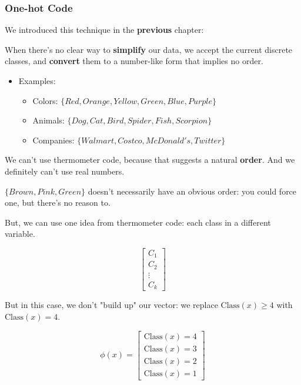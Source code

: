             \subsecdiv
            \subsubsection{One-hot Code}

                We introduced this technique in the \textbf{previous} chapter:
                
                When there's no clear way to \textbf{simplify} our data, we accept the current discrete classes, and \textbf{convert} them to a number-like form that implies no order.

                \begin{itemize}
                    \item Examples:
                    \begin{itemize}
                        \item Colors: $\{Red, Orange, Yellow, Green, Blue, Purple\}$
                        \item Animals: $\{Dog, Cat, Bird, Spider, Fish, Scorpion\}$
                        \item Companies: $\{Walmart, Costco, McDonald's, Twitter\}$
                    \end{itemize}
                \end{itemize}

                We can't use thermometer code, because that suggests a natural \textbf{order}. And we definitely can't use real numbers.

                \miniex $\{Brown, Pink, Green\}$ doesn't necessarily have an obvious order: you could force one, but there's no reason to.

                But, we can use one idea from thermometer code: each class in a different variable.
        
                \begin{equation}
                    \begin{bmatrix}
                      C_1\\C_2\\ \vdots \\ C_k
                    \end{bmatrix}
                \end{equation}

                But in this case, we don't "build up" our vector: we replace $\text{Class}(x)\geq 4$ with $\text{Class}(x)= 4$.

                \begin{equation}
                    \phi(x) =
                    \begin{bmatrix}
                        \text{Class}(x) = 4 \\
                        \text{Class}(x) = 3\\
                        \text{Class}(x) = 2\\
                        \text{Class}(x) = 1
                    \end{bmatrix}
                \end{equation}
                
